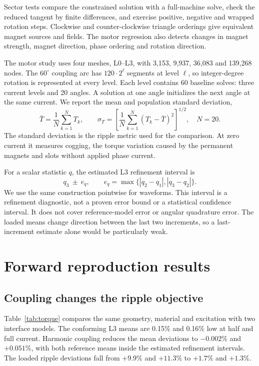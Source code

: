 \documentclass{anvil-paper}
\begin{document}
Sector tests compare the constrained solution with a full-machine solve,
check the reduced tangent by finite differences, and exercise positive,
negative and wrapped rotation steps. Clockwise and counter-clockwise
triangle orderings give equivalent magnet sources and fields. The motor
regression also detects changes in magnet strength, magnet direction,
phase ordering and rotation direction.

The motor study uses four meshes, L0--L3, with 3,153, 9,937, 36,083 and
139,268 nodes. The $60^\circ$ coupling arc has $120\cdot2^\ell$ segments at level
$\ell$, so integer-degree rotation is represented at every level.
Each level contains 60 baseline solves: three current levels and 20
angles. A solution at one angle initializes the next angle at the same
current. We report the mean and population standard deviation,
\begin{equation}
 \bar T=\frac1N\sum_{k=1}^N T_k,\qquad
 \sigma_T=\left[\frac1N\sum_{k=1}^N(T_k-\bar T)^2\right]^{1/2},
 \quad N=20.
\end{equation}
The standard deviation is the ripple metric used for the comparison.
At zero current it measures cogging, the torque variation caused by the
permanent magnets and slots without applied phase current.

For a scalar statistic $q$, the estimated L3 refinement interval is
\begin{equation}
 q_3\ \pm\ e_q,\qquad
 e_q=\max\{|q_2-q_1|,|q_3-q_2|\}.
 \label{eq:band}
\end{equation}
We use the same construction pointwise for waveforms. This interval is a
refinement diagnostic, not a proven error bound or a statistical confidence
interval. It does not cover reference-model error or angular quadrature
error. The loaded means change direction between the last two increments,
so a last-increment estimate alone would be particularly weak.

\section{Forward reproduction results}
\subsection{Coupling changes the ripple objective}\label{sec:coupling-results}
Table~\ref{tab:torque} compares the same geometry, material and excitation
with two interface models. The conforming L3 means are 0.15\% and 0.16\%
low at half and full current. Harmonic coupling reduces the mean deviations
to $-0.002\%$ and $+0.051\%$, with both reference means inside the estimated
refinement intervals. The loaded ripple deviations fall from $+9.9\%$
and $+11.3\%$ to $+1.7\%$ and $+1.3\%$.
\end{document}
